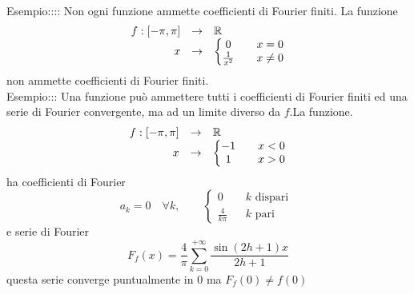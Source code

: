\\
Esempio:::: Non ogni funzione ammette coefficienti di Fourier finiti. La funzione
\[\begin{array}{rcl} f: \left[-\pi,\pi\right] & \to &  \mathbb{R} \\
x & \to & \left\{\begin{matrix} 0 && x=0\\\frac{1}{x^2}&&x\ne 0 \end{matrix}\right. \end{array}\]
non ammette coefficienti di Fourier finiti.\\
Esempio::: Una funzione può ammettere tutti i coefficienti di Fourier finiti ed una serie di Fourier convergente, ma ad un limite diverso da $f$.La funzione.
\[\begin{array}{rcl} f: \left[-\pi,\pi\right] & \to &  \mathbb{R} \\
x & \to & \left\{\begin{matrix} -1 && x<0\\1&&x>0 \end{matrix}\right. \end{array}\]
ha coefficienti di Fourier
\[a_k=0\quad\forall k,\qquad \left\{\begin{matrix}0 && k\text{ dispari }\\ \frac{4}{k\pi}&& k \text{ pari } \end{matrix}\right.\]
e serie di Fourier
\[ F_f(x)= \frac{4}{\pi}\sum\limits_{k=0}^{+\infty}\frac{\sin(2h+1)x}{2h+1} \]
questa serie converge puntualmente in $0$ ma $F_f(0)\ne f(0)$\\

